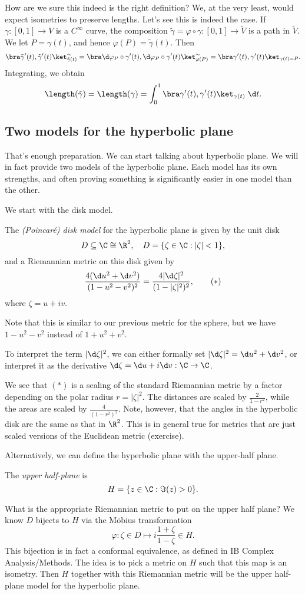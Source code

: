 \documentclass[a4paper]{article}
\begin{document}
How are we sure this indeed is the right definition? We, at the very least, would expect isometries to preserve lengths. Let's see this is indeed the case. If $\gamma: [0, 1] \to V$ is a $C^\infty$ curve, the composition $\tilde{\gamma} = \varphi \circ \gamma: [0, 1] \to \tilde{V}$ is a path in $\tilde{V}$. We let $P = \gamma(t)$, and hence $\varphi(P) = \tilde{\gamma}(t)$. Then
\[
  \bra \tilde{\gamma}'(t), \tilde{\gamma}'(t)\ket_{\tilde{\gamma}(t)}^\sim = \bra \d \varphi_P \circ \gamma'(t), \d \varphi_P \circ \gamma'(t)\ket_{\varphi(P)}^\sim = \bra \gamma'(t), \gamma'(t)\ket_{\gamma(t) = P}.
\]
Integrating, we obtain
\[
  \length(\tilde{\gamma}) = \length(\gamma) = \int_0^1 \bra \gamma'(t), \gamma'(t)\ket _{\gamma(t)} \;\d t.
\]
\subsection{Two models for the hyperbolic plane}
That's enough preparation. We can start talking about hyperbolic plane. We will in fact provide two models of the hyperbolic plane. Each model has its own strengths, and often proving something is significantly easier in one model than the other.

We start with the disk model.
\begin{defi}
  The \emph{(Poincar\'e) disk model} for the hyperbolic plane is given by the unit disk
  \[
    D \subseteq \C\cong \R^2,\quad D = \{\zeta \in \C: |\zeta| < 1\},
  \]
  and a Riemannian metric on this disk given by
  \[
    \frac{4(\d u^2 + \d v^2)}{(1 - u^2 - v^2)^2} = \frac{4 |\d \zeta|^2}{(1 - |\zeta|^2)^2},\tag{$*$}
  \]
  where $\zeta = u + iv$.
\end{defi}
Note that this is similar to our previous metric for the sphere, but we have $1 - u^2 - v^2$ instead of $1 + u^2 + v^2$.

To interpret the term $|\d \zeta|^2$, we can either formally set $|\d \zeta|^2 = \d u^2 + \d v^2$, or interpret it as the derivative $\d \zeta = \d u + i \d v: \C \to \C$.

We see that $(*)$ is a scaling of the standard Riemannian metric by a factor depending on the polar radius $r = |\zeta|^2$. The distances are scaled by $\frac{2}{1 - r^2}$, while the areas are scaled by $\frac{4}{(1 - r^2)^2}$. Note, however, that the angles in the hyperbolic disk are the same as that in $\R^2$. This is in general true for metrics that are just scaled versions of the Euclidean metric (exercise).

Alternatively, we can define the hyperbolic plane with the upper-half plane.
\begin{defi}
  The \emph{upper half-plane} is
  \[
    H = \{z \in \C: \Im(z) > 0\}.
  \]
\end{defi}
What is the appropriate Riemannian metric to put on the upper half plane? We know $D$ bijects to $H$ via the M\"obius transformation
\[
  \varphi: \zeta \in D \mapsto i \frac{1 + \zeta}{1 - \zeta} \in H.
\]
This bijection is in fact a conformal equivalence, as defined in IB Complex Analysis/Methods. The idea is to pick a metric on $H$ such that this map is an isometry. Then $H$ together with this Riemannian metric will be the upper half-plane model for the hyperbolic plane.
\end{document}
